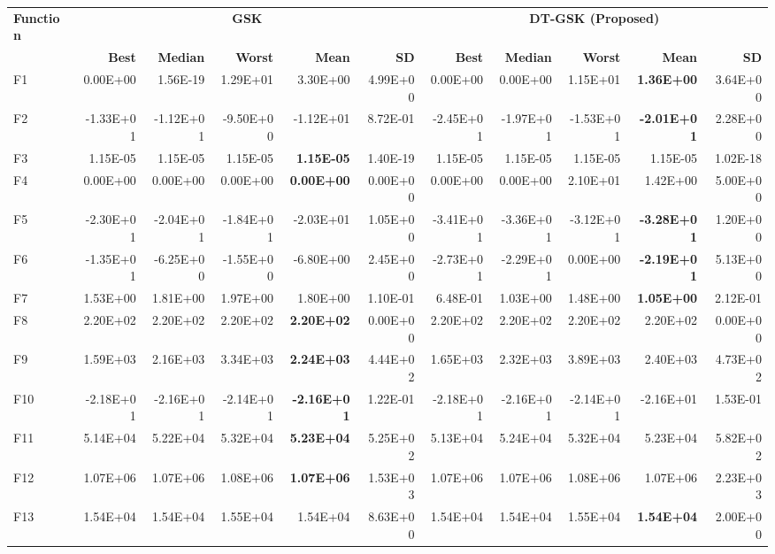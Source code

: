 \zebra
\begin{tabular}{lrrrrrrrrrr}
\toprule
\textbf{Function} & \multicolumn{5}{c}{\textbf{GSK}} & \multicolumn{5}{c}{\textbf{DT-GSK (Proposed)}} \\
\cmidrule(lr){2-6} \cmidrule(lr){7-11}
 & \textbf{Best} & \textbf{Median} & \textbf{Worst} & \textbf{Mean} & \textbf{SD} & \textbf{Best} & \textbf{Median} & \textbf{Worst} & \textbf{Mean} & \textbf{SD} \\
\midrule
F1 & 0.00E+00 & 1.56E-19 & 1.29E+01 & 3.30E+00 & 4.99E+00 & 0.00E+00 & 0.00E+00 & 1.15E+01 & \textbf{1.36E+00} & 3.64E+00 \\
F2 & -1.33E+01 & -1.12E+01 & -9.50E+00 & -1.12E+01 & 8.72E-01 & -2.45E+01 & -1.97E+01 & -1.53E+01 & \textbf{-2.01E+01} & 2.28E+00 \\
F3 & 1.15E-05 & 1.15E-05 & 1.15E-05 & \textbf{1.15E-05} & 1.40E-19 & 1.15E-05 & 1.15E-05 & 1.15E-05 & 1.15E-05 & 1.02E-18 \\
F4 & 0.00E+00 & 0.00E+00 & 0.00E+00 & \textbf{0.00E+00} & 0.00E+00 & 0.00E+00 & 0.00E+00 & 2.10E+01 & 1.42E+00 & 5.00E+00 \\
F5 & -2.30E+01 & -2.04E+01 & -1.84E+01 & -2.03E+01 & 1.05E+00 & -3.41E+01 & -3.36E+01 & -3.12E+01 & \textbf{-3.28E+01} & 1.20E+00 \\
F6 & -1.35E+01 & -6.25E+00 & -1.55E+00 & -6.80E+00 & 2.45E+00 & -2.73E+01 & -2.29E+01 & 0.00E+00 & \textbf{-2.19E+01} & 5.13E+00 \\
F7 & 1.53E+00 & 1.81E+00 & 1.97E+00 & 1.80E+00 & 1.10E-01 & 6.48E-01 & 1.03E+00 & 1.48E+00 & \textbf{1.05E+00} & 2.12E-01 \\
F8 & 2.20E+02 & 2.20E+02 & 2.20E+02 & \textbf{2.20E+02} & 0.00E+00 & 2.20E+02 & 2.20E+02 & 2.20E+02 & 2.20E+02 & 0.00E+00 \\
F9 & 1.59E+03 & 2.16E+03 & 3.34E+03 & \textbf{2.24E+03} & 4.44E+02 & 1.65E+03 & 2.32E+03 & 3.89E+03 & 2.40E+03 & 4.73E+02 \\
F10 & -2.18E+01 & -2.16E+01 & -2.14E+01 & \textbf{-2.16E+01} & 1.22E-01 & -2.18E+01 & -2.16E+01 & -2.14E+01 & -2.16E+01 & 1.53E-01 \\
F11 & 5.14E+04 & 5.22E+04 & 5.32E+04 & \textbf{5.23E+04} & 5.25E+02 & 5.13E+04 & 5.24E+04 & 5.32E+04 & 5.23E+04 & 5.82E+02 \\
F12 & 1.07E+06 & 1.07E+06 & 1.08E+06 & \textbf{1.07E+06} & 1.53E+03 & 1.07E+06 & 1.07E+06 & 1.08E+06 & 1.07E+06 & 2.23E+03 \\
F13 & 1.54E+04 & 1.54E+04 & 1.55E+04 & 1.54E+04 & 8.63E+00 & 1.54E+04 & 1.54E+04 & 1.55E+04 & \textbf{1.54E+04} & 2.00E+00 \\

\end{tabular}
